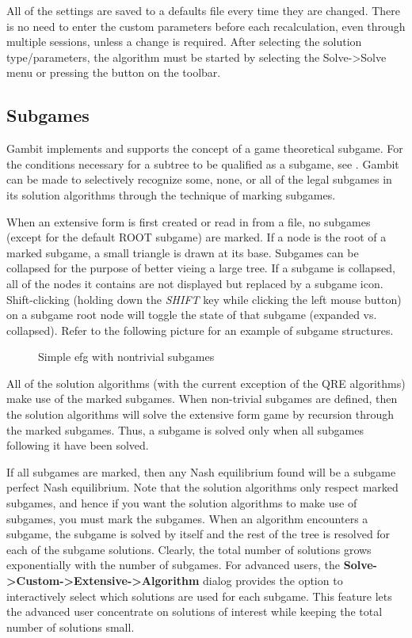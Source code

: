 \documentclass[12pt]{report}
\begin{document}
All of the settings are saved to a defaults file every time they are
changed. There is no need to enter the custom parameters before each
recalculation, even through multiple sessions, unless a change is
required.  After selecting the solution type/parameters, the algorithm
must be started by selecting the Solve->Solve menu or pressing the
button on the toolbar.

\subsection{Subgames}\label{Subgames}
Gambit implements and supports the concept of a game theoretical
subgame. For the conditions necessary for a subtree to be qualified as
a subgame, see \cite{Selten:1975}.  Gambit can be made to selectively
recognize some, none, or all of the legal subgames in its solution
algorithms through the technique of marking subgames.

When an extensive form is first created or read in from a file, no
subgames (except for the default ROOT subgame) are marked.  If a node
is the root of a marked subgame, a small triangle is drawn at its
base.  Subgames can be collapsed for the purpose of better vieing a
large tree.  If a subgame is collapsed, all of the nodes it contains
are not displayed but replaced by a subgame icon.  Shift-clicking
(holding down the {\em SHIFT} key while clicking the left mouse
button) on a subgame root node will toggle the state of that subgame
(expanded vs. collapsed).  Refer to the following picture for an
example of subgame structures.


\begin{figure}
\caption{Simple efg with nontrivial subgames}\label{fig_subgames}
\end{figure}

All of the solution algorithms (with the current exception of the 
QRE algorithms) make use of the marked subgames.  When non-trivial 
subgames are defined, then the solution algorithms will solve the 
extensive form game by recursion through the marked subgames.  Thus, a 
subgame is solved only when all subgames following it have been 
solved.  

If all subgames are marked, then any Nash equilibrium found will be a
subgame perfect Nash equilibrium.  Note that the solution algorithms
only respect marked subgames, and hence if you want the solution
algorithms to make use of subgames, you must mark the subgames.  When
an algorithm encounters a subgame, the subgame is solved by itself and
the rest of the tree is resolved for each of the subgame solutions.
Clearly, the total number of solutions grows exponentially with the
number of subgames.  For advanced users, the {\bf 
Solve->Custom->Extensive->Algorithm} dialog provides the option to
interactively select which solutions are used for each subgame.  This
feature lets the advanced user concentrate on solutions of interest
while keeping the total number of solutions small.
\end{document}
